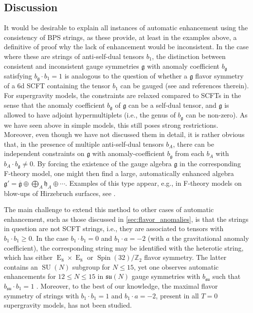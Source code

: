 \documentclass[11pt, a4paper]{article}
\newcommand*{\bbZ}{\ensuremath{\mathbb{Z}}}
\newcommand*{\fkg}{\ensuremath{\mathfrak{g}}}
\newcommand*{\fkh}{\ensuremath{\mathfrak{h}}}
\DeclareMathOperator{\SU}{SU}
\DeclareMathOperator{\gE}{E}
\newcommand*{\fksu}{\ensuremath{\mathfrak{su}}}
\begin{document}
\subsection{Discussion}
\label{sec:discussion}

It would be desirable to explain all instances of automatic enhancement using the consistency of BPS strings, as these provide, at least in the examples above, a definitive of proof why the lack of enhancement would be inconsistent.
In the case where these are strings of anti-self-dual tensors $b_1$, the distinction between consistent and inconsistent gauge symmetries $\fkg$ with anomaly coefficient $b_\fkg$ satisfying $b_\fkg \cdot b_1=1$ is analogous to the question of whether a $\fkg$ flavor symmetry of a 6d SCFT containing the tensor $b_1$ can be gauged (see \cite{Heckman:2018jxk} and references therein).
For supergravity models, the constraints are relaxed compared to SCFTs in the sense that the anomaly coefficient $b_\fkg$ of $\fkg$ can be a self-dual tensor, and $\fkg$ is allowed to have adjoint hypermultiplets (i.e., the genus of $b_\fkg$ can be non-zero).
As we have seen above in simple models, this still poses strong restrictions.
Moreover, even though we have not discussed them in detail, it is rather obvious that, in the presence of multiple anti-self-dual tensors $b_A$, there can be independent constraints on $\fkg$ with anomaly-coefficient $b_\fkg$ from each $b_A$ with $b_A \cdot b_\fkg \ne 0$.
By forcing the existence of the gauge algebra $\fkg$ in the corresponding F-theory model, one might then find a large, automatically enhanced algebra $\fkg' = \overline{\fkg} \oplus \bigoplus_A \fkh_A \oplus \dotsb$.
Examples of this type appear, e.g., in F-theory models on blow-ups of Hirzebruch surfaces, see \cite{Raghuram:2020vxm}.


The main challenge to extend this method to other cases of automatic enhancement, such as those discussed in \cref{sec:flavor_anomalies}, is that the strings in question are not SCFT strings, i.e., they are associated to tensors with $b_1 \cdot b_1 \ge 0$.
In the case $b_1 \cdot b_1=0$ and $b_1 \cdot a =-2$ (with $a$ the gravitational anomaly coefficient), the corresponding string may be identified with the heterotic string, which has either $\gE_8 \times \gE_8$ or $\operatorname{Spin}(32)/\bbZ_2$ flavor symmetry.
The latter contains an $\SU(N)$ subgroup for $N \le 15$, yet one observes automatic enhancements for $12 \le N \le 15$ in $\fksu(N)$ gauge symmetries with $b_\fksu$ such that $b_\fksu \cdot b_1 = 1$ \cite{Raghuram:2020vxm}.
Moreover, to the best of our knowledge, the maximal flavor symmetry of strings with $b_1 \cdot b_1 =1$ and $b_1 \cdot a = -2$, present in all $T=0$ supergravity models, has not been studied.
\end{document}
